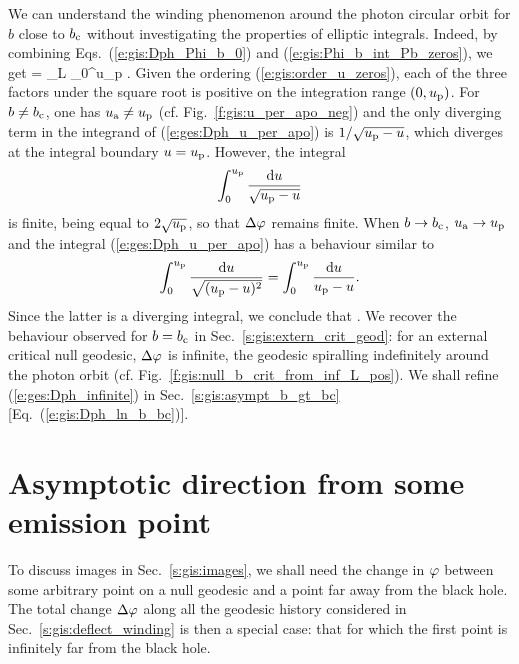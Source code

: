 We can understand the winding phenomenon
around the photon circular orbit for $b$ close to $b_{\rm c}$
without investigating the properties of elliptic integrals.
Indeed, by combining Eqs.~(\ref{e:gis:Dph_Phi_b_0}) and (\ref{e:gis:Phi_b_int_Pb_zeros}),
we get
\be \label{e:ges:Dph_u_per_apo}
    \Delta\ph = \eps_L  \int_0^{u_{\rm p}}
     .
\ee
Given the ordering (\ref{e:gis:order_u_zeros}), each of the
three factors under the square root is positive on the integration range
$(0,u_{\rm p})$. For $b\not=b_{\rm c}$, one has $u_{\rm a}\not=u_{\rm p}$
(cf. Fig.~\ref{f:gis:u_per_apo_neg})
and
the only diverging term in the integrand of (\ref{e:ges:Dph_u_per_apo})
is $1/\sqrt{u_{\rm p} - u}$, which
diverges at the integral boundary $u=u_{\rm p}$. However, the integral
\[
    \int_0^{u_{\rm p}}
    \frac{\mathrm{d} u}{\sqrt{u_{\rm p} - u}}
\]
is finite, being equal to $2\sqrt{u_{\rm p}}$, so that $\Delta\varphi$ remains
finite. When $b\to b_{\rm c}$,
$u_{\rm a} \to u_{\rm p}$ and the integral (\ref{e:ges:Dph_u_per_apo})
has a behaviour similar to
\[
     \int_0^{u_{\rm p}}
    \frac{\mathrm{d} u}{\sqrt{(u_{\rm p} - u)^2}} = \int_0^{u_{\rm p}}
    \frac{\mathrm{d} u}{u_{\rm p} - u} .
\]
Since the latter is a diverging integral, we conclude that
\be \label{e:ges:Dph_infinite}
    .
\ee
We recover the behaviour observed for $b=b_{\rm c}$ in
Sec.~\ref{s:gis:extern_crit_geod}: for
an external critical null geodesic,
$\Delta\varphi$ is infinite, the geodesic spiralling indefinitely around the
photon orbit (cf. Fig.~\ref{f:gis:null_b_crit_from_inf_L_pos}).
We shall refine (\ref{e:ges:Dph_infinite}) in Sec.~\ref{s:gis:asympt_b_gt_bc}
[Eq.~(\ref{e:gis:Dph_ln_b_bc})].


\section{Asymptotic direction from some emission point}

To discuss images in Sec.~\ref{s:gis:images},
we shall need the change in $\varphi$ between some
arbitrary point on a null geodesic and a point far away
from the black hole.
The total change $\Delta\varphi$ along all the geodesic history
considered in Sec.~\ref{s:gis:deflect_winding} is then a special case: that for which the first point is
infinitely far from the black hole.

